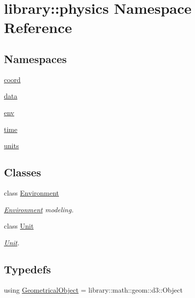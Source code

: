\hypertarget{namespacelibrary_1_1physics}{}\section{library\+:\+:physics Namespace Reference}
\label{namespacelibrary_1_1physics}
\subsection*{Namespaces}
\begin{DoxyCompactItemize}
\item 
 \hyperlink{namespacelibrary_1_1physics_1_1coord}{coord}
\item 
 \hyperlink{namespacelibrary_1_1physics_1_1data}{data}
\item 
 \hyperlink{namespacelibrary_1_1physics_1_1env}{env}
\item 
 \hyperlink{namespacelibrary_1_1physics_1_1time}{time}
\item 
 \hyperlink{namespacelibrary_1_1physics_1_1units}{units}
\end{DoxyCompactItemize}
\subsection*{Classes}
\begin{DoxyCompactItemize}
\item 
class \hyperlink{classlibrary_1_1physics_1_1_environment}{Environment}
\begin{DoxyCompactList}\small\item\em \hyperlink{classlibrary_1_1physics_1_1_environment}{Environment} modeling. \end{DoxyCompactList}\item 
class \hyperlink{classlibrary_1_1physics_1_1_unit}{Unit}
\begin{DoxyCompactList}\small\item\em \hyperlink{classlibrary_1_1physics_1_1_unit}{Unit}. \end{DoxyCompactList}\end{DoxyCompactItemize}
\subsection*{Typedefs}
\begin{DoxyCompactItemize}
\item 
using \hyperlink{namespacelibrary_1_1physics_a188a48c84b083aea628a2bd98f6b8e0a}{Geometrical\+Object} = library\+::math\+::geom\+::d3\+::\+Object
\end{DoxyCompactItemize}
